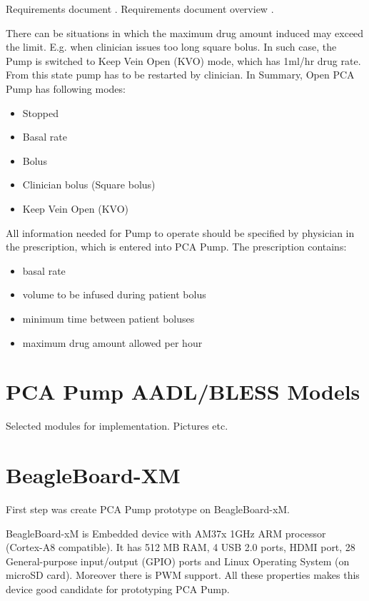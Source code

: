 Requirements document \cite{PcaReq}.
Requirements document overview \cite{OpenSourcePCAPump:Paper}.

There can be situations in which the maximum drug amount induced may exceed the limit. E.g. when clinician issues too long square bolus. In such case, the Pump is switched to Keep Vein Open (KVO) mode, which has 1ml/hr drug rate. From this state pump has to be restarted by clinician. In Summary, Open PCA Pump has following modes:
\begin{itemize}
    \item Stopped
    \item Basal rate
    \item Bolus
    \item Clinician bolus (Square bolus)
    \item Keep Vein Open (KVO)
\end{itemize}

All information needed for Pump to operate should be specified by physician in the prescription, which is entered into PCA Pump. The prescription contains:
\begin{itemize}
    \item basal rate
    \item volume to be infused during patient bolus
    \item minimum time between patient boluses
    \item maximum drug amount allowed per hour
\end{itemize}





\section{PCA Pump AADL/BLESS Models}
\label{pcapump:aadl-bless-models}
Selected modules for implementation. Pictures etc.



\section{BeagleBoard-XM}
\label{pcapump:beagleboard}
First step was create PCA Pump prototype on BeagleBoard-xM.

BeagleBoard-xM is Embedded device with AM37x 1GHz ARM processor (Cortex-A8 compatible). It has 512 MB RAM, 4 USB 2.0 ports, HDMI port, 28 General-purpose input/output (GPIO) ports and Linux Operating System (on microSD card). Moreover there is PWM support. All these properties makes this device good candidate for prototyping PCA Pump.

